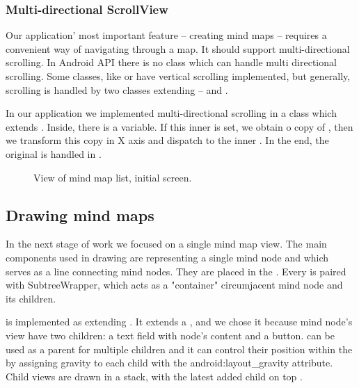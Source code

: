 \subsubsection{Multi-directional ScrollView}
\label{subsubsec:action-bar}
Our application' most important feature -- creating mind maps -- requires a convenient way of navigating through a map. It should support multi-directional scrolling. In Android API there is no class which can handle multi directional scrolling. Some classes, like  or  have vertical scrolling implemented, but generally, scrolling is handled by two classes extending  --  and . 

In our application we implemented multi-directional scrolling in a class  which extends . Inside, there is a  variable. If this inner  is set, we obtain o copy of , then we transform this copy in X axis and dispatch to the inner . In the end, the original  is handled in .

\begin{figure}[h]
	\centering
	\caption{View of mind map list, initial screen.}
	\label{fig:screen-maplist}
\end{figure}

\subsection{Drawing mind maps}
\label{subsec:drawing}
In the next stage of work we focused on a single mind map view. The main components used in drawing are  representing a single mind node and  which serves as a line connecting mind nodes. They are placed in the . Every   is paired with SubtreeWrapper, which acts as a "container" circumjacent mind node and its children.

 is implemented as extending . It extends a , and we chose it because mind node's view have two children: a text field with node's content and a button.  can be used as a parent for multiple children and it can control their position within the  by assigning gravity to each child with the android:layout\_gravity attribute. Child views are drawn in a stack, with the latest added child on top \cite{API:2013:fl}.

